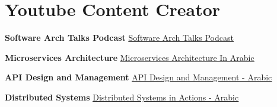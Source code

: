 \documentclass[letterpaper,11pt]{article}
\begin{document}
\section{Youtube Content Creator}
    \begin{description}[font=$\bullet$\scshape\bfseries]
    \small{
    	\item \textbf{Software Arch Talks Podcast} 	\hfill \href{https://www.youtube.com/playlist?list=PLgAqrVq84PDe3inbjHgfMJ7SVR7VenYOS}{\underline{\color{blue}Software Arch Talks Podcast}}
    	
     	\item \textbf{Microservices Architecture} 		\hfill \href{https://www.youtube.com/watch?v=9pGXaUaMyBo&list=PLgAqrVq84PDdfiDow3YVsgc1q34JD415Z}{\underline{\color{blue}Microservices Architecture In Arabic}}
     	
     	\item \textbf{API Design and Management} 	  	\hfill \href{https://www.youtube.com/playlist?list=PLgAqrVq84PDcOryFRPZmhXR_FwGauGtyv}{\color{blue}\underline{API Design and Management - Arabic}}

     	\item \textbf{Distributed Systems} 	  		\hfill \href{https://www.youtube.com/watch?v=RTdpGvrpWOI&list=PLgAqrVq84PDcg55xnbUBHuLS8tWul6-kF&pp=gAQBiAQB}{\color{blue}\underline{Distributed Systems in Actions - Arabic}}
    }
 \end{description}
\end{document}
